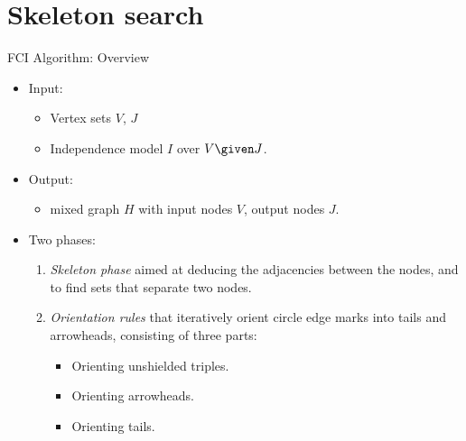 \section{Skeleton search}
\frame{\sectionpage}

\begin{frame}{FCI Algorithm: Overview}
  \begin{itemize} 
    \item Input: 
      \begin{itemize}
        \item Vertex sets $V$, $J$
        \item Independence model $I$ over $V \given J$.
      \end{itemize}
    \item Output: 
      \begin{itemize}
        \item mixed graph $H$ with input nodes $V$, output nodes $J$.
      \end{itemize}
    \item Two phases:
      \begin{enumerate}
        \item \emph{Skeleton phase} aimed at deducing the adjacencies between the nodes, and to find sets that separate two nodes.
        \item \emph{Orientation rules} that iteratively orient circle edge marks into tails and arrowheads, consisting of three parts:
          \begin{itemize}
        \item Orienting unshielded triples.
        \item Orienting arrowheads.
        \item Orienting tails.
          \end{itemize}
       \end{enumerate}
  \end{itemize}
\end{frame}

